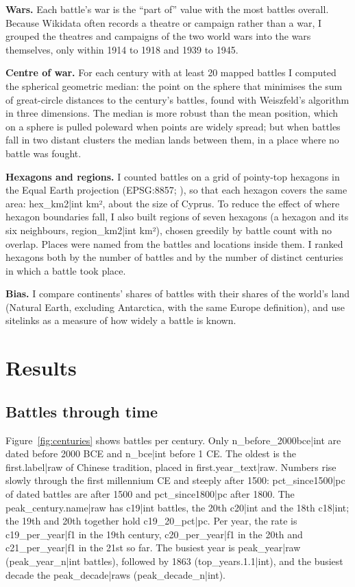 \documentclass[11pt,a4paper]{article}
\begin{document}
\textbf{Wars.} Each battle's war is the ``part of'' value with the most battles overall. Because Wikidata often records a theatre or campaign rather than a war, I grouped the theatres and campaigns of the two world wars into the wars themselves, only within 1914 to 1918 and 1939 to 1945.

\textbf{Centre of war.} For each century with at least 20 mapped battles I computed the spherical geometric median: the point on the sphere that minimises the sum of great-circle distances to the century's battles, found with Weiszfeld's algorithm in three dimensions. The median is more robust than the mean position, which on a sphere is pulled poleward when points are widely spread; but when battles fall in two distant clusters the median lands between them, in a place where no battle was fought.

\textbf{Hexagons and regions.} I counted battles on a grid of pointy-top hexagons in the Equal Earth projection (EPSG:8857; \citealp{equalearth}), so that each hexagon covers the same area: {{hex_km2|int}} km², about the size of Cyprus. To reduce the effect of where hexagon boundaries fall, I also built regions of seven hexagons (a hexagon and its six neighbours, {{region_km2|int}} km²), chosen greedily by battle count with no overlap. Places were named from the battles and locations inside them. I ranked hexagons both by the number of battles and by the number of distinct centuries in which a battle took place.

\textbf{Bias.} I compare continents' shares of battles with their shares of the world's land (Natural Earth, excluding Antarctica, with the same Europe definition), and use sitelinks as a measure of how widely a battle is known.

\section{Results}
\subsection{Battles through time}
Figure~\ref{fig:centuries} shows battles per century. Only {{n_before_2000bce|int}} are dated before 2000 BCE and {{n_bce|int}} before 1 CE. The oldest is the {{first.label|raw}} of Chinese tradition, placed in {{first.year_text|raw}}. Numbers rise slowly through the first millennium CE and steeply after 1500: {{pct_since1500|pc}} of dated battles are after 1500 and {{pct_since1800|pc}} after 1800. The {{peak_century.name|raw}} has {{c19|int}} battles, the 20th {{c20|int}} and the 18th {{c18|int}}; the 19th and 20th together hold {{c19_20_pct|pc}}. Per year, the rate is {{c19_per_year|f1}} in the 19th century, {{c20_per_year|f1}} in the 20th and {{c21_per_year|f1}} in the 21st so far. The busiest year is {{peak_year|raw}} ({{peak_year_n|int}} battles), followed by 1863 ({{top_years.1.1|int}}), and the busiest decade the {{peak_decade|raw}}s ({{peak_decade_n|int}}).
\end{document}
